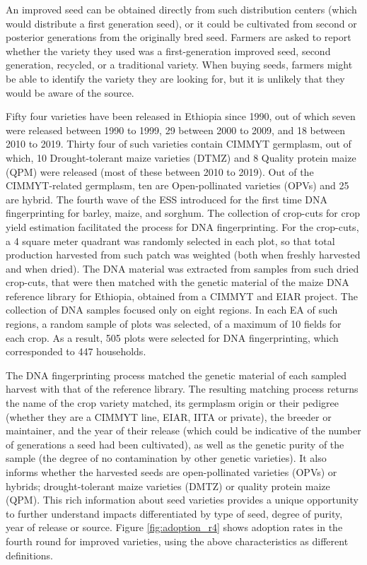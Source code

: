 \documentclass{article}
\begin{document}
An improved seed can be obtained directly from such distribution centers (which would distribute a first generation seed), or it could be cultivated from second or posterior generations from the originally bred seed. Farmers are asked to report whether the variety they used was a first-generation improved seed, second generation,  recycled, or a traditional variety. When buying seeds, farmers might be able to identify the variety they are looking for, but it is unlikely that they would be aware of the source. 

Fifty four varieties have been released in Ethiopia since 1990, out of which seven were released between 1990 to 1999, 29 between 2000 to 2009, and 18 between 2010 to 2019. Thirty four of such varieties contain CIMMYT germplasm, out of which, 10 Drought-tolerant maize varieties (DTMZ) and 8 Quality protein maize (QPM) were released (most of these between 2010 to 2019). Out of the CIMMYT-related germplasm, ten are Open-pollinated varieties (OPVs) and 25 are hybrid. 
The fourth wave of the ESS introduced for the first time DNA fingerprinting for barley, maize, and sorghum. The collection of crop-cuts for crop yield estimation facilitated the process for DNA fingerprinting. For the crop-cuts, a 4 square meter quadrant was randomly selected in each plot, so that total production harvested from such patch was weighted (both when freshly harvested and when dried). The DNA material was extracted from samples from such dried crop-cuts, that were then matched with the genetic material of the maize DNA reference library for Ethiopia, obtained from a CIMMYT and EIAR project. The collection of DNA samples focused only on eight regions. In each EA of such regions, a random sample of plots was selected, of a maximum of 10 fields for each crop. As a result, 505 plots were selected for DNA fingerprinting, which corresponded to 447 households. 

The DNA fingerprinting process matched the genetic material of each sampled harvest with that of the reference library. The resulting matching process returns the name of the crop variety matched, its germplasm origin or their pedigree (whether they are a CIMMYT line, EIAR, IITA or private), the breeder or maintainer, and the year of their release (which could be indicative of the number of generations a seed had been cultivated), as well as the genetic purity of the sample (the degree of no contamination by other genetic varieties). It also informs whether the harvested seeds are open-pollinated varieties (OPVs) or hybrids; drought-tolerant maize varieties (DMTZ) or quality protein maize (QPM). This rich information about seed varieties provides a unique opportunity to further understand impacts differentiated by type of seed, degree of purity, year of release or source. Figure \ref{fig:adoption_r4} shows adoption rates in the fourth round for improved varieties, using the above characteristics as different definitions.
\end{document}
